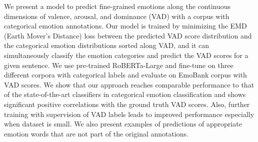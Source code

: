 We present a model to predict fine-grained emotions along the continuous dimensions of valence, arousal, and dominance (VAD) with a corpus with categorical emotion annotations. Our model is trained by minimizing the EMD (Earth Mover's Distance) loss between the predicted VAD score distribution and the categorical emotion distributions sorted along VAD, and it can simultaneously classify the emotion categories and predict the VAD scores for a given sentence. We use pre-trained RoBERTa-Large and fine-tune on three different corpora with categorical labels and evaluate on EmoBank corpus with VAD scores. We show that our approach reaches comparable performance to that of the state-of-the-art classifiers in categorical emotion classification and shows significant positive correlations with the ground truth VAD scores. Also, further training with supervision of VAD labels leads to improved performance especially when dataset is small. We also present examples of predictions of appropriate emotion words that are not part of the original annotations.
